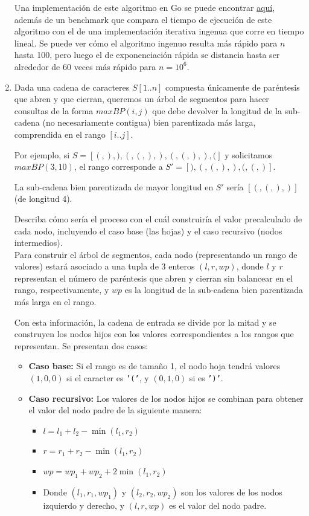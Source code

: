\documentclass[letterpaper, 12pt]{article}
\begin{document}
\begin{enumerate}
Una implementación de este algoritmo en Go se puede encontrar \href{}{aquí}, además de un benchmark que compara el tiempo de ejecución de este algoritmo con el de una implementación iterativa ingenua que corre en tiempo lineal. Se puede ver cómo el algoritmo ingenuo resulta más rápido para $n$ hasta 100, pero luego el de exponenciación rápida se distancia hasta ser alrededor de 60 veces más rápido para $n=10^6$.

\newpage

\item Dada una cadena de caracteres $S[1..n]$ compuesta únicamente de paréntesis que abren y que cierran, queremos un árbol de segmentos para hacer consultas de la forma $maxBP(i, j)$ que debe devolver la longitud de la sub-cadena (no necesariamente contigua) bien parentizada más larga, comprendida en el rango $[i..j]$.

Por ejemplo, si $S = [(, ), ), (, (, ), ), (, (, ), ), (]$ y solicitamos $maxBP(3, 10)$, el rango corresponde a $S' = [), (, (, ), ), (, (, )]$.

La sub-cadena bien parentizada de mayor longitud en $S'$ sería $[(, (, ), )]$ (de longitud 4).

Describa cómo sería el proceso con el cuál construiría el valor precalculado de cada nodo, incluyendo el caso base (las hojas) y el caso recursivo (nodos intermedios). \\

Para construir el árbol de segmentos, cada nodo (representando un rango de valores) estará asociado a una tupla de 3 enteros $(l, r, wp)$, donde $l$ y $r$ representan el número de paréntesis que abren y cierran sin balancear en el rango, respectivamente, y $wp$ es la longitud de la sub-cadena bien parentizada más larga en el rango.

Con esta información, la cadena de entrada se divide por la mitad y se construyen los nodos hijos con los valores correspondientes a los rangos que representan. Se presentan dos casos:

\begin{itemize}
    \item \textbf{Caso base:} Si el rango es de tamaño 1, el nodo hoja tendrá valores $(1, 0, 0)$ si el caracter es \texttt{'('}, y $(0, 1, 0)$ si es \texttt{')'}.
    \item \textbf{Caso recursivo:} Los valores de los nodos hijos se combinan para obtener el valor del nodo padre de la siguiente manera:
    \begin{itemize}
        \item $l = l_1 + l_2 - \min(l_1, r_2)$
        \item $r = r_1 + r_2 - \min(l_1, r_2)$
        \item $wp = wp_1 + wp_2 + 2\min(l_1, r_2)$
        \item Donde $(l_1, r_1, wp_1)$ y $(l_2, r_2, wp_2)$ son los valores de los nodos izquierdo y derecho, y $(l, r, wp)$ es el valor del nodo padre.
    \end{itemize}


\end{itemize}
\end{enumerate}
\end{document}
